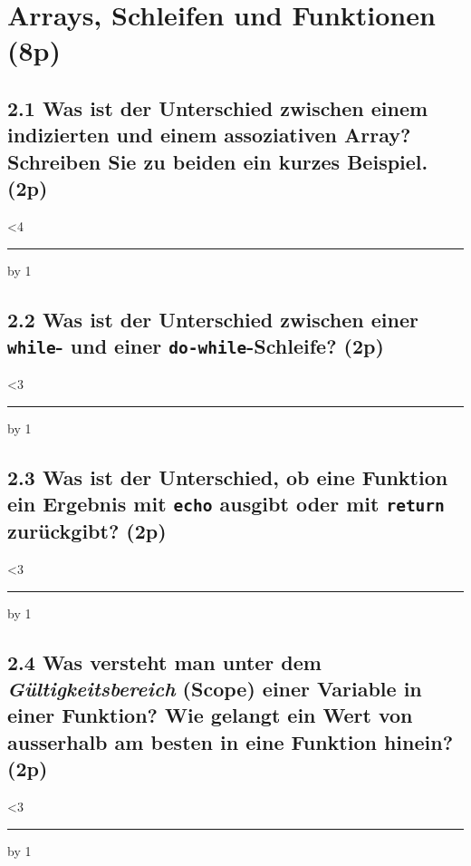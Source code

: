 \documentclass[a4paper,12pt]{article}
\newif\ifsolution
\newcommand{\antwort}[2]{%
  \ifsolution
    \par\smallskip{\color{sol}\textbf{Lösung:} #2}\par\medskip
  \else
    \par\vspace{0.3cm}%
    \answerlines{#1}%
  \fi}
\newcommand{\answerlines}[1]{%
  \linecount=0
  \loop\ifnum\linecount<#1
    \vspace{0.75cm}\noindent\rule{\linewidth}{0.4pt}\par
    \advance\linecount by 1
  \repeat\par\medskip}
\newcommand{\pt}[1]{\hfill\textbf{(#1p)}}
\begin{document}
\section{Arrays, Schleifen und Funktionen (8p)}

\subsection*{2.1 \normalsize\mdseries Was ist der Unterschied zwischen einem indizierten und einem assoziativen Array? Schreiben Sie zu beiden ein kurzes Beispiel. \pt{2}}
\antwort{4}{Indiziert: PHP vergibt die Schlüssel automatisch ab 0, z.B. \texttt{["Apfel", "Birne"]} (1p). Assoziativ: Die Schlüssel werden selbst definiert (meist Strings), z.B. \texttt{["name" => "Anna", "age" => 23]} (1p).}

\subsection*{2.2 \normalsize\mdseries Was ist der Unterschied zwischen einer \texttt{while}- und einer \texttt{do-while}-Schleife? \pt{2}}
\antwort{3}{Bei \texttt{while} wird die Bedingung \emph{vor} jedem Durchlauf geprüft; ist sie von Anfang an \texttt{false}, läuft die Schleife nie (1p). Bei \texttt{do-while} wird sie erst \emph{nach} dem Durchlauf geprüft, die Schleife läuft also mindestens einmal (1p).}

\subsection*{2.3 \normalsize\mdseries Was ist der Unterschied, ob eine Funktion ein Ergebnis mit \texttt{echo} ausgibt oder mit \texttt{return} zurückgibt? \pt{2}}
\antwort{3}{\texttt{echo} schreibt den Wert nur in die Ausgabe, danach steht er im Programm nicht mehr zur Verfügung (1p). \texttt{return} gibt den Wert an die Aufrufstelle zurück, wo er weiterverwendet werden kann (z.B. in einer Variable); zudem beendet \texttt{return} die Funktion (1p).}

\subsection*{2.4 \normalsize\mdseries Was versteht man unter dem \emph{Gültigkeitsbereich} (Scope) einer Variable in einer Funktion? Wie gelangt ein Wert von ausserhalb am besten in eine Funktion hinein? \pt{2}}
\antwort{3}{Variablen innerhalb einer Funktion sind lokal und existieren nur dort; Variablen von ausserhalb sind in der Funktion nicht sichtbar (1p). Am besten übergibt man den Wert als Parameter (und gibt das Ergebnis mit \texttt{return} zurück); \texttt{global} ist möglich, aber zu vermeiden (1p).}
\end{document}
